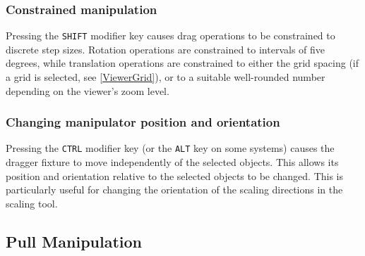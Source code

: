 \documentclass{article}
\begin{document}

\subsubsection{Constrained manipulation}

Pressing the {\tt SHIFT} modifier key causes drag operations to be
constrained to discrete step sizes. Rotation operations are
constrained to intervals of five degrees, while translation operations
are constrained to either the grid spacing (if a grid is selected, see
\ref{ViewerGrid}), or to a suitable well-rounded number depending on
the viewer's zoom level.

\subsubsection{Changing manipulator position and orientation}
\label{ChangingManipulatorPose}

Pressing the {\tt CTRL} modifier key (or the {\tt ALT} key on some
systems) causes the dragger fixture to move independently of the
selected objects. This allows its position and orientation relative to
the selected objects to be changed. This is particularly useful for
changing the orientation of the scaling directions in the scaling
tool.

\subsection{Pull Manipulation}
\label{PullManipulationSec}
\end{document}
